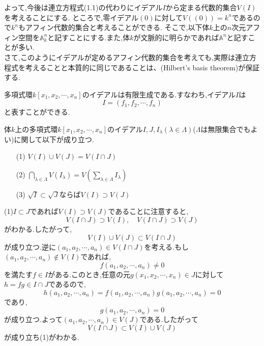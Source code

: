 \documentclass[dvipdfmx,a4paper,11pt]{jsarticle}
\begin{document}
よって,今後は連立方程式(1.1)の代わりにイデアル$I$から定まる代数的集合$V(I)$を考えることにする.
\clearpage
ところで,零イデアル$(0)$に対して$V((0))=k^n$であるので$k^n$もアフィン代数的集合と考えることができる.
そこで,以下体$k$上の$n$次元アフィン空間を$\mathbb{A}^{n}_{k}$と記すことにする.また,体$k$が文脈的に明らかであれば$\mathbb{A}^n$と記すことが多い.\\
さて,このようにイデアルが定めるアフィン代数的集合を考えても,実際は連立方程式を考えることと本質的に同じであることは、(Hilbert's basis theorem)が保証する.
\begin{tcolorbox}[title = 定理1.2(Hilbertの基底定理)]
  多項式環$k[x_{1},x_{2},\cdots,x_{n}]$のイデアルは有限生成である.すなわち,イデアル$I$は
  \begin{equation*}
    I=(f_{1},f_{2},\cdots,f_{n})
  \end{equation*}
  と表すことができる.
\end{tcolorbox}
\begin{tcolorbox}[title = 命題1.3]
  体$k$上の多項式環$k[x_{1},x_{2},\cdots,x_{n}]$のイデアル$I,J,I_{\lambda}(\lambda\in \Lambda)$($\Lambda$は無限集合でもよい)に関して以下が成り立つ.
  \begin{itemize}
    \item[(1)] $V(I)\cup V(J)=V(I\cap J)$
    \item[(2)] $\bigcap_{\lambda\in \Lambda} V(I_{\lambda})=V(\sum_{\lambda\in \Lambda}I_{\lambda})$ 
    \item[(3)] $\sqrt{I}\subset \sqrt{J}$ならば$V(I)\supset V(J)$
  \end{itemize}
\end{tcolorbox}
\begin{tcolorbox}[title = 証明(1)]
  (1)$I\subset J$であれば$V(I)\supset V(J)$であることに注意すると,
  \begin{equation*}
    V(I\cap J) \supset V(I),\quad V(I\cap J)\supset V(J)
  \end{equation*}
  がわかる.したがって,
  \begin{equation*}
    V(I)\cup V(J)\subset V(I\cap J)
  \end{equation*}
  が成り立つ.逆に$(a_{1},a_{2},\cdots,a_{n})\in V(I\cap J)$を考える.もし$(a_{1},a_{2},\cdots,a_{n})\notin V(I)$であれば,
  \begin{equation*}
    f(a_{1},a_{2},\cdots,a_{n})\neq0
  \end{equation*}
  を満たす$f\in I$がある.このとき,任意の元$g(x_{1},x_{2},\cdots,x_{n})\in J$に対して$h=fg\in I\cap J$であるので,
  \begin{equation*}
    h(a_{1},a_{2},\cdots,a_{n})=f(a_{1},a_{2},\cdots,a_{n})g(a_{1},a_{2},\cdots,a_{n})=0
  \end{equation*}
  であり,
  \begin{equation*}
    g(a_{1},a_{2},\cdots,a_{n})=0
  \end{equation*}
  が成り立つ.よって$(a_{1},a_{2},\cdots,a_{n})\in V(J)$である.したがって
  \begin{equation*}
    V(I\cap J)\subset V(I)\cup V(J)
  \end{equation*}
  が成り立ち(1)がわかる.
\end{tcolorbox}
\end{document}
